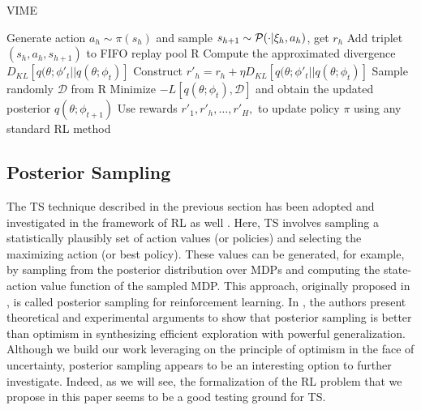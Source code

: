 \begin{algorithm}[t]
	\caption{\gls{VIME}}
	\label{alg:VIME}
	\begin{algorithmic}[1]
			\State Generate action $a_h\sim\pi(s_h)$ and sample $s_{h+1}\sim\mathcal{P}(\cdot|\xi_h,a_h)$, get $r_h$
			\State Add triplet $(s_h,a_h,s_{h+1})$ to FIFO replay pool R
			\State Compute the approximated divergence $D_{KL}[q(\theta;\phi'_{t}||q(\theta;\phi_{t})]$
			\State Construct $r'_h = r_h + \eta D_{KL}[q(\theta;\phi'_{t}||q(\theta;\phi_{t})]$
		\EndFor
		\State Sample randomly $\mathcal{D}$ from R
		\State Minimize $-L[q(\theta;\phi_t),\mathcal{D}]$ and obtain the updated posterior $q(\theta;\phi_{t+1})$
		\State Use rewards ${r'_1,r'_h,\dots,r'_H,}$ to update policy $\pi$ using any standard \gls{RL} method
	\EndFor
	\end{algorithmic}
\end{algorithm}

\subsection{Posterior Sampling}
The \gls{TS} technique described in the previous section has been adopted and investigated in the framework of \gls{RL} as well \cite{strens2000bayesian, osband2013more, osband2015bootstrapped, osband2016deep}. Here, \gls{TS} involves sampling a statistically plausibly set of action values (or policies) and selecting the maximizing action (or best policy). These values can be generated, for example, by sampling from the posterior distribution over MDPs and computing the state-action value function of the sampled MDP. This approach, originally proposed in \cite{strens2000bayesian}, is called posterior sampling for reinforcement learning. In \cite{osband2017posterior}, the authors present theoretical and experimental arguments to show that posterior sampling is better than optimism in synthesizing efficient exploration with powerful generalization. Although we build our work leveraging on the principle of optimism in the face of uncertainty, posterior sampling appears to be an interesting option to further investigate. Indeed, as we will see, the formalization of the \gls{RL} problem that we propose in this paper seems to be a good testing ground for \gls{TS}.